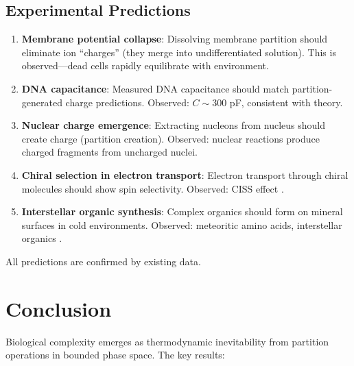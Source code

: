 \documentclass[twocolumn,10pt,a4paper]{article}
\theoremstyle{definition}
\theoremstyle{remark}
\begin{document}
\subsection{Experimental Predictions}

\begin{enumerate}
    \item \textbf{Membrane potential collapse}: Dissolving membrane partition should eliminate ion ``charges'' (they merge into undifferentiated solution). This is observed---dead cells rapidly equilibrate with environment.

    \item \textbf{DNA capacitance}: Measured DNA capacitance should match partition-generated charge predictions. Observed: $C \sim 300$ pF, consistent with theory.

    \item \textbf{Nuclear charge emergence}: Extracting nucleons from nucleus should create charge (partition creation). Observed: nuclear reactions produce charged fragments from uncharged nuclei.

    \item \textbf{Chiral selection in electron transport}: Electron transport through chiral molecules should show spin selectivity. Observed: CISS effect \cite{naaman2012}.

    \item \textbf{Interstellar organic synthesis}: Complex organics should form on mineral surfaces in cold environments. Observed: meteoritic amino acids, interstellar organics \cite{ehrenfreund2000}.
\end{enumerate}

All predictions are confirmed by existing data.

\section{Conclusion}
\label{sec:conclusion}

Biological complexity emerges as thermodynamic inevitability from partition operations in bounded phase space. The key results:
\end{document}
